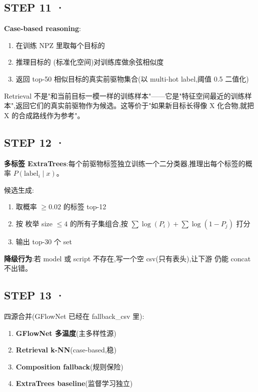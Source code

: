 \subsection{STEP 11 · }

\textbf{Case-based reasoning}:
\begin{enumerate}
    \item 在训练 NPZ 里取每个目标的 
    \item 推理目标的 (标准化空间)对训练库做余弦相似度
    \item 返回 top-50 相似目标的真实前驱物集合(以 multi-hot label,阈值 0.5 二值化)
\end{enumerate}

\begin{repobox}[可重复要点 \#4]
Retrieval 不是"和当前目标一模一样的训练样本"——它是"特征空间最近的训练样本",返回它们的真实前驱物作为候选。这等价于"如果新目标长得像 X 化合物,就把 X 的合成路线作为参考"。
\end{repobox}

\subsection{STEP 12 · }

\textbf{多标签 ExtraTrees}:每个前驱物标签独立训练一个二分类器,推理出每个标签的概率 $P(\text{label}_i \mid x)$。

候选生成:
\begin{enumerate}
    \item 取概率 $\geq 0.02$ 的标签 top-12
    \item 按  枚举 size $\leq 4$ 的所有子集组合,按 $\sum\log(P_i) + \sum\log(1-P_j)$ 打分
    \item 输出 top-30 个 set
\end{enumerate}

\textbf{降级行为}:若 model 或 script 不存在,写一个空 csv(只有表头),让下游  仍能 concat 不出错。

\subsection{STEP 13 · }

四源合并(GFlowNet 已经在 fallback\_csv 里):
\begin{enumerate}
    \item \textbf{GFlowNet 多温度}(主多样性源)
    \item \textbf{Retrieval k-NN}(case-based,稳)
    \item \textbf{Composition fallback}(规则保险)
    \item \textbf{ExtraTrees baseline}(监督学习独立)
\end{enumerate}

